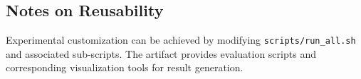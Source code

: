 




\subsection{Notes on Reusability}

Experimental customization can be achieved by modifying \texttt{scripts/run\_all.sh} and associated sub-scripts. The artifact provides evaluation scripts and corresponding visualization tools for result generation.

